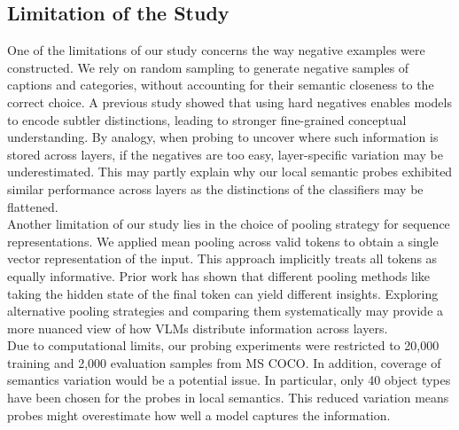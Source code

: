 \documentclass[11pt]{article}
\begin{document}
\subsection{Limitation of the Study}
One of the limitations of our study concerns the way negative examples were constructed. We rely on random sampling to generate negative samples of captions and categories, without accounting for their semantic closeness to the correct choice.
A previous study \cite{roesch2024EnhancingConceptualUnderstandinginMultimodal} showed that using hard negatives enables models to encode subtler distinctions, leading to stronger fine-grained conceptual understanding.
By analogy, when probing to uncover where such information is stored across layers, if the negatives are too easy, layer-specific variation may be underestimated.
This may partly explain why our local semantic probes exhibited similar performance across layers as the distinctions of the classifiers may be flattened. \\
Another limitation of our study lies in the choice of pooling strategy for sequence representations.
We applied mean pooling across valid tokens to obtain a single vector representation of the input. This approach implicitly treats all tokens as equally informative.
Prior work \cite{tang2024PoolingAndAttention} has shown that different pooling methods like taking the hidden state of the final token can yield different insights. Exploring alternative pooling strategies and comparing them systematically may provide a more nuanced view of how VLMs distribute information across layers. \\
Due to computational limits, our probing experiments were restricted to 20,000 training and 2,000 evaluation samples from MS COCO.
In addition, coverage of semantics variation would be a potential issue.
In particular, only 40 object types have been chosen for the probes in local semantics.
This reduced variation means probes might overestimate how well a model captures the information.
\end{document}
